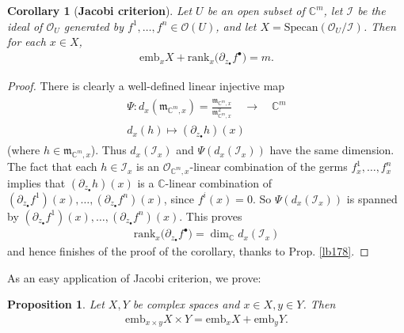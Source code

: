 \documentclass[12pt,b5paper,notitlepage]{report}
\theoremstyle{definition}
\theoremstyle{plain}
\newtheorem{pp}[df]{Proposition}
\newtheorem{co}[df]{Corollary}
\newcommand{\mc}{\mathcal}
\newcommand{\scr}{\mathscr}
\newcommand{\blt}{\bullet}
\newcommand{\Cbb}{\mathbb C}
\newcommand{\Specan}{\mathrm{Specan}}
\newcommand{\rank}{\mathrm{rank}}
\newcommand{\emb}{\mathrm{emb}}
\newcommand{\mk}{\mathfrak m}
\numberwithin{equation}{section}
\begin{document}
\begin{co}[\textbf{Jacobi criterion}]\label{lb383}
Let $U$ be an open subset of $\Cbb^m$, let $\mc I$ be the ideal of $\scr O_U$ generated by $f^1,\dots,f^n\in\scr O(U)$, and let $X=\Specan(\scr O_U/\mc I)$. Then for each $x\in X$,
\begin{align}
\emb_xX+\rank_x\big(\partial_{z_\blt}f^\blt\big)=m.
\end{align}
\end{co}


\begin{proof}
There is clearly a well-defined linear injective map
\begin{gather}
\begin{gathered}
\Psi:d_x(\mk_{\Cbb^m,x})=\frac{\mk_{\Cbb^m,x}}{\mk_{\Cbb^m,x}^2}\quad\longrightarrow \quad\Cbb^m\\
d_x(h)\mapsto (\partial_{z_\blt}h)(x)
\end{gathered}
\end{gather}
(where $h\in\mk_{\Cbb^m,x}$). Thus $d_x(\mc I_x)$ and $\Psi(d_x(\mc I_x))$ have the same dimension. The fact that each $h\in\mc I_x$ is an $\scr O_{\Cbb^m,x}$-linear combination of the germs $f^1_x,\dots,f^n_x$ implies that $(\partial_{z_\blt}h)(x)$ is a $\Cbb$-linear combination of $(\partial_{z_\blt}f^1)(x),\dots,(\partial_{z_\blt}f^n)(x)$, since $f^i(x)=0$. So $\Psi(d_x(\mc I_x))$ is spanned by $(\partial_{z_\blt}f^1)(x),\dots,(\partial_{z_\blt}f^n)(x)$. This proves
\begin{align}
\rank_x\big(\partial_{z_\blt}f^\blt\big)=\dim_\Cbb d_x(\mc I_x)
\end{align}
and hence finishes of the proof of the corollary, thanks to Prop. \ref{lb178}.
\end{proof}



As an easy application of Jacobi criterion, we prove:

\begin{pp}\label{lb183}
Let $X,Y$ be complex spaces and $x\in X,y\in Y$. Then
\begin{align}
\emb_{x\times y}X\times Y=\emb_xX+\emb_yY.
\end{align}
\end{pp}
\end{document}
